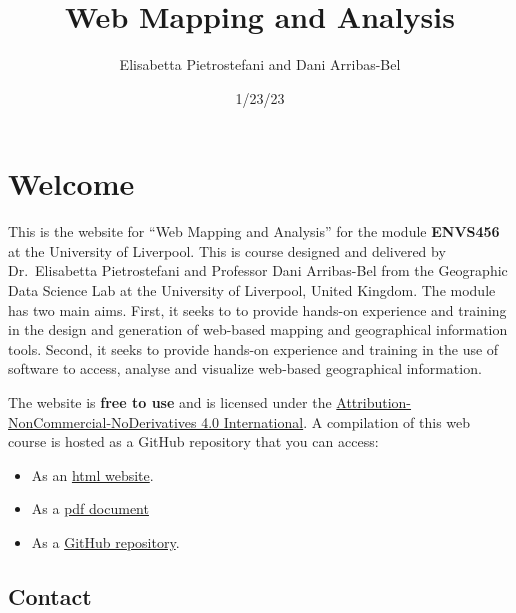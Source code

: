 \documentclass[
  letterpaper,
  DIV=11,
  numbers=noendperiod]{scrreprt}
\title{Web Mapping and Analysis}
\author{Elisabetta Pietrostefani and Dani Arribas-Bel}
\date{1/23/23}
\providecommand{\tightlist}{%
  \setlength{\itemsep}{0pt}\setlength{\parskip}{0pt}}\usepackage{longtable,booktabs,array}
\renewcommand*\contentsname{Table of contents}
\newcommand\contentsname{Table of contents}
\begin{document}
\maketitle
\ifdefined\Shaded\renewenvironment{Shaded}{\begin{tcolorbox}[interior hidden, breakable, borderline west={3pt}{0pt}{shadecolor}, enhanced, boxrule=0pt, sharp corners, frame hidden]}{\end{tcolorbox}}\fi

\renewcommand*\contentsname{Table of contents}
{
\hypersetup{linkcolor=}
\setcounter{tocdepth}{2}
\tableofcontents
}

\hypertarget{welcome}{%
\chapter*{Welcome}\label{welcome}}


This is the website for ``Web Mapping and Analysis'' for the module
\textbf{ENVS456} at the University of Liverpool. This is course designed
and delivered by Dr.~Elisabetta Pietrostefani and Professor Dani
Arribas-Bel from the Geographic Data Science Lab at the University of
Liverpool, United Kingdom. The module has two main aims. First, it seeks
to to provide hands-on experience and training in the design and
generation of web-based mapping and geographical information tools.
Second, it seeks to provide hands-on experience and training in the use
of software to access, analyse and visualize web-based geographical
information.

The website is \textbf{free to use} and is licensed under the
\href{https://creativecommons.org/licenses/by-nc-nd/4.0/}{Attribution-NonCommercial-NoDerivatives
4.0 International}. A compilation of this web course is hosted as a
GitHub repository that you can access:

\begin{itemize}
\tightlist
\item
  As an \href{https://gdsl-ul.github.io/wma}{html website}.
\item
  As a \href{https://github.com/GDSL-UL/wma/raw/main/index.pdf}{pdf
  document}
\item
  As a \href{https://github.com/GDSL-UL/wma}{GitHub repository}.
\end{itemize}

\hypertarget{contact}{%
\section*{Contact}\label{contact}}
\end{document}
